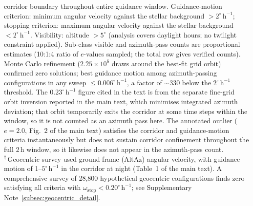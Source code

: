 \documentclass[11pt,a4paper]{article}
\begin{document}
\begin{table}[htbp]
\begin{minipage}{0.95\linewidth}
corridor boundary throughout entire guidance window.
Guidance-motion criterion: minimum angular velocity against the stellar
background $> 2^\circ\,\mathrm{h}^{-1}$; stopping criterion:
maximum angular velocity against the stellar background $< 2^\circ\,\mathrm{h}^{-1}$.
Visibility: altitude $> 5^\circ$ (analysis covers daylight hours; no twilight constraint applied).
Sub-class visible and azimuth-pass counts are proportional estimates
(10:1:4 ratio of $e$-values sampled; the total row gives verified counts).
Monte Carlo refinement ($2.25\times10^6$ draws around the best-fit grid
orbit) confirmed zero solutions; best guidance motion among
azimuth-passing configurations in any sweep $\leq 0.006^\circ\,\mathrm{h}^{-1}$,
a factor of ${\sim}330$ below the $2^\circ\,\mathrm{h}^{-1}$ threshold.
The $0.23^\circ\,\mathrm{h}^{-1}$ figure cited in the text is from the
separate fine-grid orbit inversion reported in the main text, which
minimises integrated azimuth deviation; that orbit temporarily exits the
corridor at some time steps within the window, so it is not counted as an
azimuth pass here.
The annotated outlier ($e=2.0$, Fig.~2 of the main text) satisfies the
corridor and guidance-motion criteria instantaneously but does not sustain
corridor confinement throughout the full 2\,h window, so it likewise does not
appear in the azimuth-pass count.\\
$^\dagger$\,Geocentric survey used ground-frame (AltAz) angular velocity,
with guidance motion of 1--$5^\circ\,\mathrm{h}^{-1}$ in the corridor at night
(Table~1 of the main text). A comprehensive survey of 28,800 hypothetical geocentric configurations finds
zero satisfying all criteria with $\omega_\mathrm{stop} < 0.20^\circ\,\mathrm{h}^{-1}$;
see Supplementary Note~\ref{subsec:geocentric_detail}.\end{minipage}
\end{table}
\end{document}
